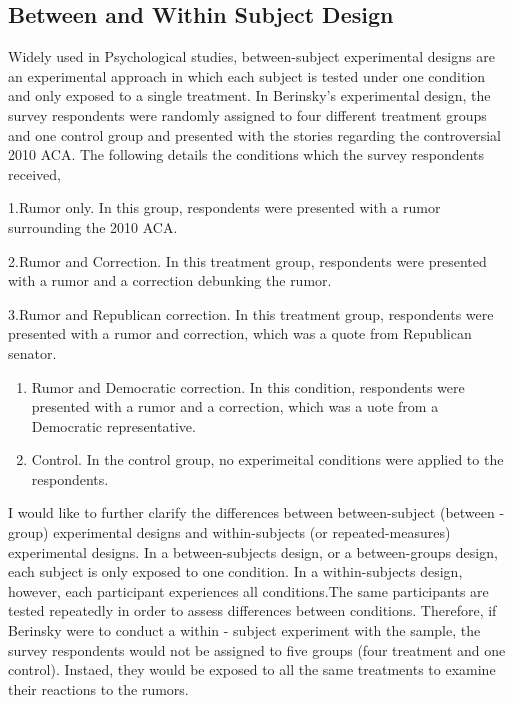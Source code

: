 \documentclass[AER]{AEA}
\begin{document}
\hypertarget{between-and-within-subject-design}{%
\subsection{Between and Within Subject
Design}\label{between-and-within-subject-design}}

Widely used in Psychological studies, between-subject experimental
designs are an experimental approach in which each subject is tested
under one condition and only exposed to a single treatment. In
Berinsky's experimental design, the survey respondents were randomly
assigned to four different treatment groups and one control group and
presented with the stories regarding the controversial 2010 ACA. The
following details the conditions which the survey respondents received,

1.Rumor only. In this group, respondents were presented with a rumor
surrounding the 2010 ACA.

2.Rumor and Correction. In this treatment group, respondents were
presented with a rumor and a correction debunking the rumor.

3.Rumor and Republican correction. In this treatment group, respondents
were presented with a rumor and correction, which was a quote from
Republican senator.

\begin{enumerate}
\def\labelenumi{\arabic{enumi}.}
\setcounter{enumi}{3}
\item
  Rumor and Democratic correction. In this condition, respondents were
  presented with a rumor and a correction, which was a uote from a
  Democratic representative.
\item
  Control. In the control group, no experimeital conditions were applied
  to the respondents.
\end{enumerate}

I would like to further clarify the differences between between-subject
(between - group) experimental designs and within-subjects (or
repeated-measures) experimental designs. In a between-subjects design,
or a between-groups design, each subject is only exposed to one
condition. In a within-subjects design, however, each participant
experiences all conditions.The same participants are tested repeatedly
in order to assess differences between conditions. Therefore, if
Berinsky were to conduct a within - subject experiment with the sample,
the survey respondents would not be assigned to five groups (four
treatment and one control). Instaed, they would be exposed to all the
same treatments to examine their reactions to the rumors.
\end{document}
